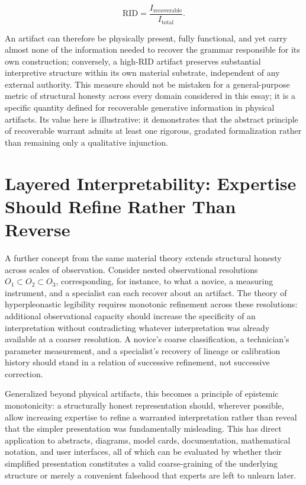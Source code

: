 \documentclass[11pt]{article}
\begin{document}
\[
\mathrm{RID} = \frac{I_{\mathrm{recoverable}}}{I_{\mathrm{total}}}.
\]

An artifact can therefore be physically present, fully functional, and yet carry almost none of the information needed to recover the grammar responsible for its own construction; conversely, a high-RID artifact preserves substantial interpretive structure within its own material substrate, independent of any external authority. This measure should not be mistaken for a general-purpose metric of structural honesty across every domain considered in this essay; it is a specific quantity defined for recoverable generative information in physical artifacts. Its value here is illustrative: it demonstrates that the abstract principle of recoverable warrant admits at least one rigorous, gradated formalization rather than remaining only a qualitative injunction.

\section{Layered Interpretability: Expertise Should Refine Rather Than Reverse}

A further concept from the same material theory extends structural honesty across scales of observation. Consider nested observational resolutions $O_1 \subset O_2 \subset O_3$, corresponding, for instance, to what a novice, a measuring instrument, and a specialist can each recover about an artifact. The theory of hyperpleonastic legibility requires monotonic refinement across these resolutions: additional observational capacity should increase the specificity of an interpretation without contradicting whatever interpretation was already available at a coarser resolution. A novice's coarse classification, a technician's parameter measurement, and a specialist's recovery of lineage or calibration history should stand in a relation of successive refinement, not successive correction.

Generalized beyond physical artifacts, this becomes a principle of epistemic monotonicity: a structurally honest representation should, wherever possible, allow increasing expertise to refine a warranted interpretation rather than reveal that the simpler presentation was fundamentally misleading. This has direct application to abstracts, diagrams, model cards, documentation, mathematical notation, and user interfaces, all of which can be evaluated by whether their simplified presentation constitutes a valid coarse-graining of the underlying structure or merely a convenient falsehood that experts are left to unlearn later.
\end{document}
